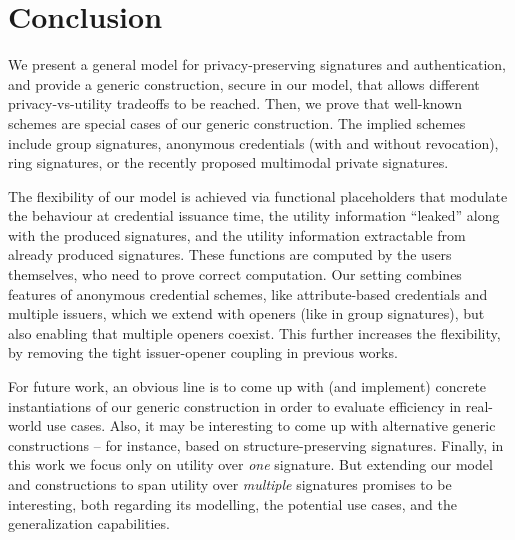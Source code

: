 \section{Conclusion}
\label{sec:conclusion}

We present a general model for privacy-preserving signatures and authentication,
and provide a generic construction, secure in our model, that allows
different privacy-vs-utility tradeoffs to be reached.
%
Then, we prove that well-known schemes are special cases of our generic
construction. The implied schemes include group signatures, anonymous
credentials (with and without revocation), ring signatures, or the recently
proposed multimodal private signatures.

The flexibility of our model is achieved via functional placeholders that
modulate the behaviour at credential issuance time, the utility
information ``leaked'' along with the produced signatures, and the utility
information extractable from already produced signatures. These functions are
computed by the users themselves, who need to prove correct computation.
Our setting combines features of anonymous credential schemes, like
attribute-based credentials and multiple issuers, which we extend with openers
(like in group signatures), but also enabling that multiple openers coexist.
This further increases the flexibility, by removing the tight issuer-opener
coupling in previous works.

For future work, an obvious line is to come up with (and implement) concrete
instantiations of our generic construction in order to evaluate efficiency in
real-world use cases. Also, it may be interesting to come up with alternative
generic constructions -- for instance, based on structure-preserving signatures.
%
Finally, in this work we focus only on utility over \emph{one} signature. But
extending our model and constructions to span utility over \emph{multiple}
signatures promises to be interesting, both regarding its modelling, the
potential use cases, and the generalization capabilities.


